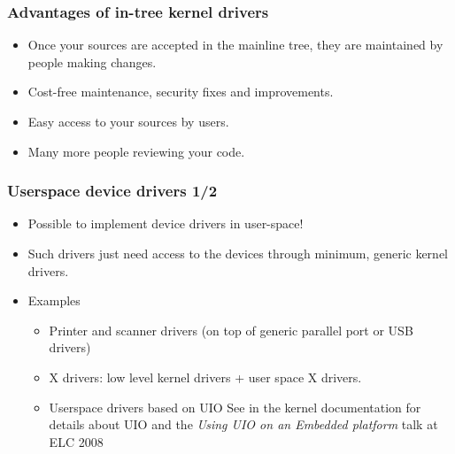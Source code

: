 \begin{frame}
  \frametitle{Advantages of in-tree kernel drivers}
  \begin{itemize}
  \item Once your sources are accepted in the mainline tree, they are
    maintained by people making changes.
  \item Cost-free maintenance, security fixes and improvements.
  \item Easy access to your sources by users.
  \item Many more people reviewing your code.
  \end{itemize}
\end{frame}

\begin{frame}
  \frametitle{Userspace device drivers 1/2}
  \begin{itemize}
  \item Possible to implement device drivers in user-space!
  \item Such drivers just need access to the devices through minimum,
    generic kernel drivers.
  \item Examples
    \begin{itemize}
    \item Printer and scanner drivers (on top of generic parallel port
      or USB drivers)
    \item X drivers: low level kernel drivers + user space X drivers.
    \item Userspace drivers based on UIO See
       in the kernel
      documentation for details about UIO and the \emph{Using UIO on
        an Embedded platform} talk at ELC 2008
    \end{itemize}
  \end{itemize}
\end{frame}

